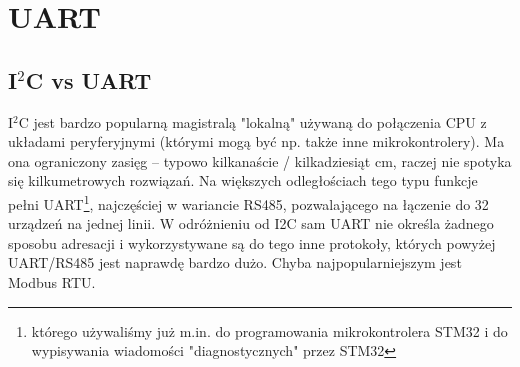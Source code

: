 % 
% 
% 
% 

\ifdefined\mysection
	\def\useExternalSection{TRUE}
\else
	\newcommand\mysection[1]{\section{#1}}
	\newcommand\mysubsection[1]{\subsection{#1}}
\fi

\mysection{UART}

\mysubsection{I$^2$C vs UART}

I$^2$C jest bardzo popularną magistralą "lokalną" używaną do połączenia CPU z układami peryferyjnymi (którymi mogą być np. także inne mikrokontrolery).
Ma ona ograniczony zasięg – typowo kilkanaście / kilkadziesiąt cm, raczej nie spotyka się kilkumetrowych rozwiązań.
Na większych odległościach tego typu funkcje pełni UART\footnote{którego używaliśmy już m.in. do programowania mikrokontrolera STM32 i do wypisywania wiadomości "diagnostycznych" przez STM32},
	najczęściej w wariancie RS485, pozwalającego na łączenie do 32 urządzeń na jednej linii.
W odróżnieniu od I2C sam UART nie określa żadnego sposobu adresacji i wykorzystywane są do tego inne protokoły, których powyżej UART/RS485 jest naprawdę bardzo dużo.
Chyba najpopularniejszym jest Modbus RTU.



